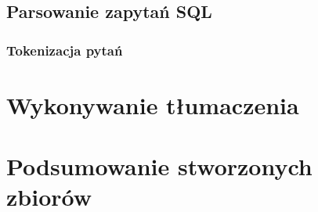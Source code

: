 \subsection{Parsowanie zapytań SQL}

\subsubsection{Tokenizacja pytań}

\section{Wykonywanie tłumaczenia}

\section{Podsumowanie stworzonych zbiorów}
